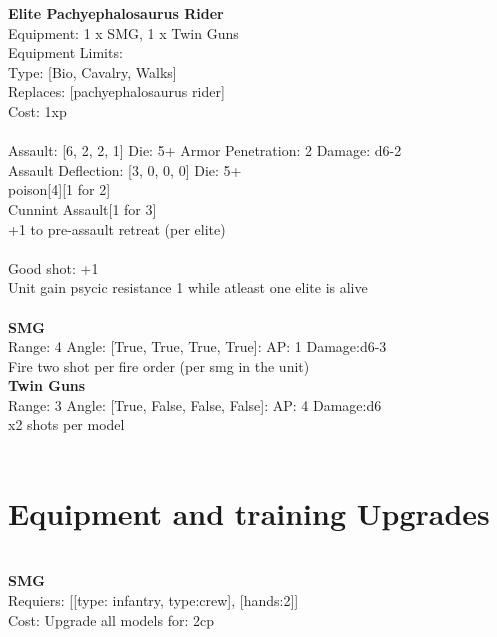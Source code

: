 {\bf Elite Pachyephalosaurus Rider } \\
Equipment: 1 x SMG, 1 x Twin Guns \\
Equipment Limits:  \\
Type: [Bio, Cavalry, Walks] \\
Replaces: [pachyephalosaurus rider] \\
Cost: 1xp\\
\ \\
Assault: [6, 2, 2, 1] Die: 5+ Armor Penetration: 2 Damage: d6-2 \\
Assault Deflection: [3, 0, 0, 0] Die: 5+\\
\indent poison[4][1 for 2]\\ 
Cunnint Assault[1 for 3]\\ 
+1 to pre-assault retreat (per elite)\\ 
 
\ \\
Good shot: +1\\ 
Unit gain psycic resistance 1 while atleast one elite is alive\\ 

\ \\
{\bf SMG } \\



Range: 4  Angle: [True, True, True, True]: AP: 1 Damage:d6-3 \\
Fire two shot per fire order (per smg in the unit)\\ 




{\bf Twin Guns } \\



Range: 3  Angle: [True, False, False, False]: AP: 4 Damage:d6 \\
x2 shots per model\\ 




 
\ \\

\section{Equipment and training Upgrades}\ \\
{\bf SMG } \\

Requiers: [[type: infantry, type:crew], [hands:2]] \\
Cost: Upgrade all models for: 2cp \\


